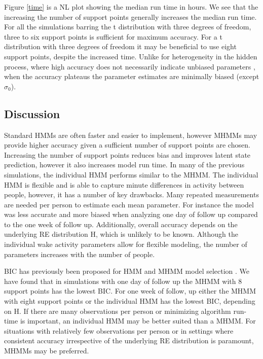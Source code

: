 \documentclass[num-refs]{wiley-article}
\begin{document}
Figure \ref{time} is a NL plot showing the median run time in hours. We see that the increasing the number of support points generally increases the median run time. For all the simulations barring the t distribution with three degrees of freedom, three to six support points is sufficient for maximum accuracy. For a t distribution with three degrees of freedom it may be beneficial to use eight support points, despite the increased time. Unlike for heterogeneity in the hidden process, where high accuracy does not necessarily indicate unbiased parameters \cite{mcclintock2021}, when the accuracy plateaus the parameter estimates are minimally biased (except $\sigma_0$).


\subsection{Discussion}\label{SimStudyDiscussion}

Standard HMMs are often faster and easier to implement, however MHMMs may provide higher accuracy given a sufficient number of support points are chosen. Increasing the number of support points reduces bias and improves latent state prediction, however it also increases model run time. In many of the previous simulations, the individual HMM performs similar to the MHMM. The individual HMM is flexible and is able to capture minute differences in activity between people, however, it has a number of key drawbacks. Many repeated measurements are needed per person to estimate each mean parameter. For instance the model was less accurate and more biased when analyzing one day of follow up compared to the one week of follow up. Additionally, overall accuracy depends on the underlying RE distribution H, which is unlikely to be known. Although the individual wake activity parameters allow for flexible modeling, the number of parameters increases with the number of people.

BIC has previously been proposed for HMM and MHMM model selection \cite{maruotti2009}. We have found that in simulations with one day of follow up the MHMM with 8 support points has the lowest BIC. For one week of follow, up either the MHMM with eight support points or the individual HMM has the lowest BIC, depending on H. If there are many observations per person or minimizing algorithm run-time is important, an individual HMM may be better suited than a MHMM. For situations with relatively few observations per person or in settings where consistent accuracy irrespective of the underlying RE distribution is paramount, MHMMs may be preferred. 
\end{document}
